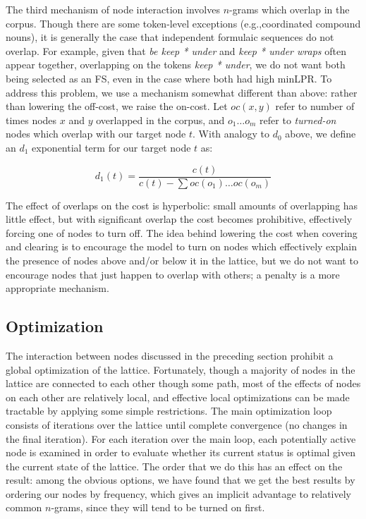 \documentclass[11pt]{article}
\makeatletter
\def \eg {e.g.,\@ }
\makeatother
\begin{document}
The third mechanism of node interaction involves $n$-grams which overlap in the corpus. Though there are some token-level exceptions (\eg coordinated compound nouns), it is generally the case that independent formulaic sequences do not overlap. For example, given that \emph{be keep * under} and \emph{keep * under wraps} often appear together, overlapping on the tokens \emph{keep * under}, we do not want both being selected as an FS, even in the case where both had high minLPR. To address this problem, we use a mechanism somewhat different than above: rather than lowering the off-cost, we raise the on-cost. Let $oc(x,y)$ refer to number of times nodes $x$ and $y$ overlapped in the corpus, and $o_1\ldots o_m$ refer to \emph{turned-on} nodes which overlap with our target node $t$. With analogy to $d_0$ above, we define an $d_1$ exponential term for our target node $t$ as:

\begin{displaymath}
d_{1}(t) = \frac{c(t)}{c(t) - \sum{oc(o_1)\ldots oc(o_m)}}
\end{displaymath}

The effect of overlaps on the cost is hyperbolic: small amounts of overlapping has little effect, but with significant overlap the cost becomes prohibitive, effectively forcing one of nodes to turn off. The idea behind lowering the cost when covering and clearing is to encourage the model to turn on nodes which effectively explain the presence of nodes above and/or below it in the lattice, but we do not want to encourage nodes that just happen to overlap with others; a penalty is a more appropriate mechanism.

 
\subsection{Optimization}

The interaction between nodes discussed in the preceding section prohibit a global optimization of the lattice. Fortunately, though a majority of nodes in the lattice are connected to each other though some path, most of the effects of nodes on each other are relatively local, and effective local optimizations can be made tractable by applying some simple restrictions. The main optimization loop consists of iterations over the lattice until complete convergence (no changes in the final iteration). For each iteration over the main loop, each potentially active node is examined in order to evaluate whether its current status is optimal given the current state of the lattice. The order that we do this has an effect on the result: among the obvious options, we have found that we get the best results by ordering our nodes by frequency, which gives an implicit advantage to relatively common $n$-grams, since they will tend to be turned on first.
\end{document}
